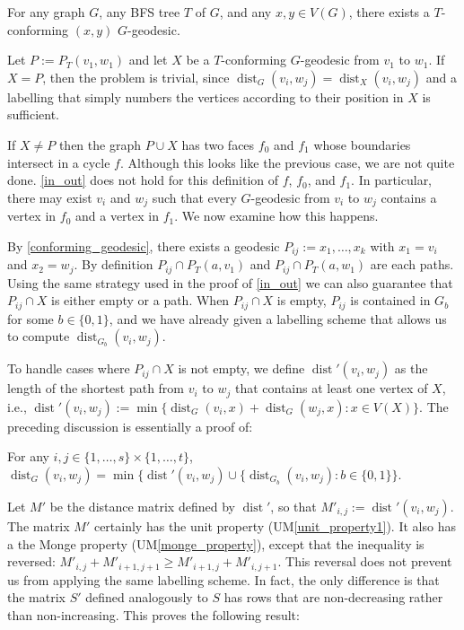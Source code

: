 \documentclass{patmorin}
\DeclareMathOperator{\dist}{dist}
\begin{document}
\begin{obs}\label{conforming_geodesic}
    For any graph $G$, any BFS tree $T$ of $G$, and any $x,y\in V(G)$, there exists a $T$-conforming $(x,y)$ $G$-geodesic.
\end{obs}

Let $P:=P_T(v_1,w_1)$ and let $X$ be a $T$-conforming $G$-geodesic from $v_1$ to $w_1$.  If $X=P$, then the problem is trivial, since $\dist_G(v_i,w_j)=\dist_{X}(v_i,w_j)$ and a labelling that simply numbers the vertices according to their position in $X$ is sufficient.

If $X\neq P$ then the graph $P\cup X$ has two faces $f_0$ and $f_1$ whose boundaries intersect in a cycle $f$.  Although this looks like the previous case, we are not quite done.  \cref{in_out} does not hold for this definition of $f$, $f_0$, and $f_1$.  In particular, there may exist $v_i$ and $w_j$ such that every $G$-geodesic from $v_i$ to $w_j$ contains a vertex in $f_0$ and a vertex in $f_1$.   We now examine how this happens.

By \cref{conforming_geodesic}, there exists a geodesic $P_{ij}:=x_1,\ldots,x_k$ with $x_1=v_i$ and $x_2=w_j$.  By definition $P_{ij}\cap P_T(a,v_1)$ and $P_{ij}\cap P_T(a,w_1)$ are each paths.  Using the same strategy used in the proof of \cref{in_out} we can also guarantee that $P_{ij}\cap X$ is either empty or a path.  When $P_{ij}\cap X$ is empty, $P_{ij}$ is contained in $G_b$ for some $b\in\{0,1\}$, and we have already given a labelling scheme that allows us to compute $\dist_{G_b}(v_i,w_j)$.

To handle cases where $P_{ij}\cap X$ is not empty, we define $\dist'(v_i,w_j)$ as the length of the shortest path from $v_i$ to $w_j$ that contains at least one vertex of $X$, i.e., $\dist'(v_i,w_j):=\min\{\dist_G(v_i,x)+\dist_G(w_j,x): x\in V(X)\}$.  The preceding discussion is essentially a proof of:

\begin{obs}\label{in_out2}
    For any $i,j\in\{1,\ldots,s\}\times\{1,\ldots,t\}$,  $\dist_G(v_i,w_j)=\min\{\dist'(v_i,w_j)\cup\{\dist_{G_b}(v_i,w_j): b\in\{0,1\}\}$.
\end{obs}

Let $M'$ be the distance matrix defined by $\dist'$, so that $M'_{i,j}:=\dist'(v_i,w_j)$.  The matrix $M'$ certainly has the unit property (UM\ref{unit_property1}).  It also has a the Monge property (UM\ref{monge_property}), except that the inequality is reversed:  $M'_{i,j}+M'_{i+1,j+1} \ge M'_{i+1,j}+M'_{i,j+1}$.  This reversal does not prevent us from applying the same labelling scheme.  In fact, the only difference is that the matrix $S'$ defined analogously to $S$ has rows that are non-decreasing rather than non-increasing.  This proves the following result:
\end{document}
